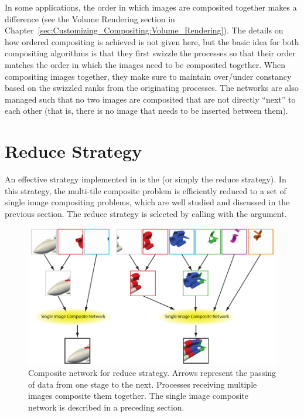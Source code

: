 
In some applications, the order in which images are composited together
makes a difference (see the Volume Rendering section in
Chapter~\ref{sec:Customizing_Compositing:Volume_Rendering}).  The details
on how ordered compositing is achieved is not given here, but the basic
idea for both compositing algorithms is that they first swizzle the
processes so that their order matches the order in which the images need to
be composited together.  When compositing images together, they make sure
to maintain over/under constancy based on the swizzled ranks from the
originating processes.  The networks are also managed such that no two
images are composited that are not directly ``next'' to each other (that
is, there is no image that needs to be inserted between them).



\section{Reduce Strategy}
\label{sec:Strategies:Reduce}


An effective strategy implemented in \IceT is the  (or simply the reduce strategy).  In this strategy, the
multi-tile composite problem is efficiently reduced to a set of single
image compositing problems, which are well studied and discussed in the
previous section.  The reduce strategy is selected by calling
 with the  argument.

\begin{figure}
  \centering
  \includegraphics{images/ReduceComposite}
  \caption[Reduce strategy composite network.]{Composite network for reduce
    strategy.  Arrows represent the passing of data from one stage to the
    next.  Processes receiving multiple images composite them together.
    The single image composite network is described in a preceding
    section.}
  \label{fig:ReduceComposite}
\end{figure}

